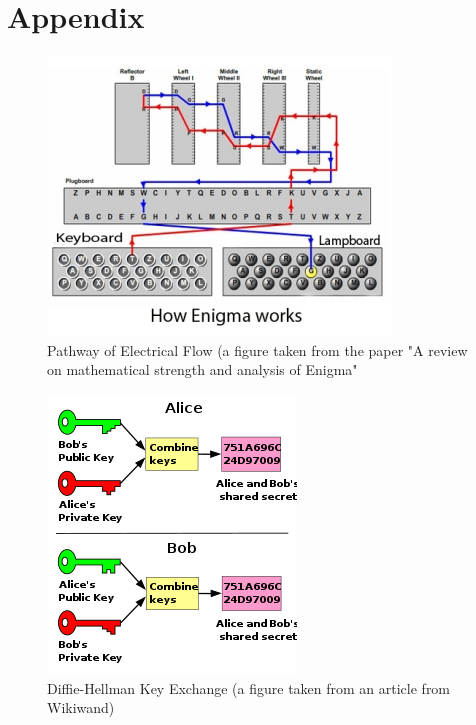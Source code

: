 \documentclass[conference,compsoc]{IEEEtran}
\begin{document}
\section{Appendix}
\begin{figure}[h!]
    \centering
    \includegraphics[scale = .7]{pathway.png}
    \caption{Pathway of Electrical Flow (a figure taken from the paper "A review on mathematical strength and analysis of Enigma"}
    \label{fig:path}
\end{figure}
\begin{figure}[h!]
    \centering
    \includegraphics[scale = .7]{dh-graph.png}
    \caption{Diffie-Hellman Key Exchange (a figure taken from an article from Wikiwand)}
    \label{fig:dh}
\end{figure}
\end{document}
